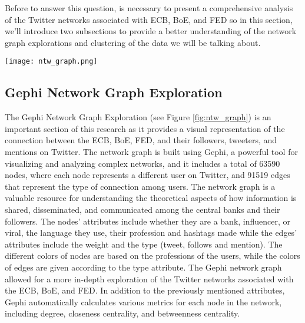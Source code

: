\documentclass[fleqn,10pt]{SelfArx} %
\begin{document}
Before to answer this question, is necessary to present a comprehensive analysis of the Twitter networks associated with ECB, BoE, and FED so in this section, we'll introduce two subsections to provide a better understanding of the network graph explorations and clustering of the data we will be talking about.



\begin{figure*}[ht]\centering %
	\texttt{[image: ntw\_graph.png]}
	\caption{ECB, BoE, FED gephi network. Please click \href{https://andreramolivaz.github.io/CT0540-graph/}{\textcolor{blue}{here}} for the link of the same graph exported in sigmajs, it will have less quality but still useful for clustering, interaction and descriptions (i.e. Degree, Betweenness Centrality) otherwise consider the gephi file in the zip.}
	\label{fig:ntw_graph}
\end{figure*}

\subsection{ Gephi Network Graph Exploration}

The Gephi Network Graph Exploration (see Figure \ref{fig:ntw_graph}) is an important section of this research as it provides a visual representation of the connection between the ECB, BoE, FED, and their followers, tweeters, and mentions on Twitter. 
The network graph is built using Gephi, a powerful tool for visualizing and analyzing complex networks, and it includes a total of 63590 nodes, where each node represents a different user on Twitter, and 91519 edges that represent the type of connection among users.
The network graph is a valuable resource for understanding the theoretical aspects of how information is shared, disseminated, and communicated among the central banks and their followers. The nodes' attributes include whether they are a bank, influencer, or viral, the language they use, their profession and hashtags made while the edges' attributes include the weight and the type (tweet, follows and mention).
The different colors of nodes are based on the professions of the users, while the colors of edges are given according to the type attribute.  The Gephi network graph allowed for a more in-depth exploration of the Twitter networks associated with the ECB, BoE, and FED. In addition to the previously mentioned attributes, Gephi automatically calculates various metrics for each node in the network, including degree, closeness centrality, and betweenness centrality.
\end{document}
